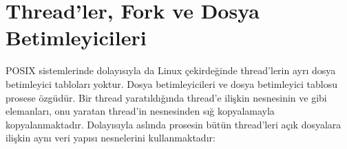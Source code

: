 \documentclass[a4paper,10pt,turkish]{sphinxmanual}
\begin{document}
\begin{sphinxVerbatim}[commandchars=\\\{\}]
\end{sphinxVerbatim}


\section{Thread’ler, Fork ve Dosya Betimleyicileri}
\label{\detokenize{filesystem1:thread-ler-fork-ve-dosya-betimleyicileri}}
\sphinxAtStartPar
POSIX sistemlerinde dolayısıyla da Linux çekirdeğinde thread’lerin ayrı dosya betimleyici
tabloları yoktur. Dosya betimleyicileri ve dosya betimleyici tablosu prosese özgüdür. Bir thread
yaratıldığında thread’e ilişkin  nesnesinin  ve  gibi elemanları,
onu yaratan thread’in  nesnesinden sığ kopyalamayla kopyalanmaktadır. Dolayısıyla
aslında prosesin bütün thread’leri açık dosyalara ilişkin aynı veri yapısı nesnelerini
kullanmaktadır:

\begin{sphinxVerbatim}[commandchars=\\\{\}]



\end{sphinxVerbatim}
\end{document}
